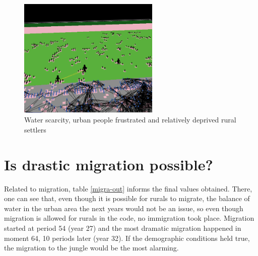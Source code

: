 \documentclass{article}
\begin{document}
\begin{itemize}
\begin{figure}[h]
  \centering
  \includegraphics[width=0.6\textwidth]{esc4}
  \caption{Water scarcity, urban people frustrated and relatively deprived rural settlers}
  \label{esc4}
\end{figure}


\end {itemize}


\clearpage

\section {Is drastic migration possible?}

Related to migration, table \ref{migra-out} informs the final values obtained. There, one can see that, even though it is possible for rurals to migrate, the balance of water in the urban area the next years would not be an issue, so even though migration is allowed for rurals in the code, no immigration took place. Migration started at period 54 (year 27) and the most dramatic migration happened in moment 64, 10 periods later (year 32). If the demographic conditions held true, the migration to the jungle would be the most alarming.
\end{document}

